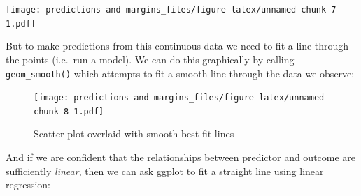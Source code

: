\documentclass[]{article}
\newenvironment{Shaded}{\begin{snugshade}}{\end{snugshade}}
\newcommand{\DataTypeTok}[1]{\textcolor[rgb]{0.13,0.29,0.53}{#1}}
\newcommand{\DecValTok}[1]{\textcolor[rgb]{0.00,0.00,0.81}{#1}}
\newcommand{\KeywordTok}[1]{\textcolor[rgb]{0.13,0.29,0.53}{\textbf{#1}}}
\newcommand{\NormalTok}[1]{#1}
\newcommand{\OperatorTok}[1]{\textcolor[rgb]{0.81,0.36,0.00}{\textbf{#1}}}
\newcommand{\StringTok}[1]{\textcolor[rgb]{0.31,0.60,0.02}{#1}}
\begin{document}
\begin{Shaded}
\end{Shaded}

\texttt{[image: predictions-and-margins\_files/figure-latex/unnamed-chunk-7-1.pdf]}

But to make predictions from this continuous data we need to fit a line through
the points (i.e.~run a model). We can do this graphically by calling
\texttt{geom\_smooth()} which attempts to fit a smooth line through the data we observe:

\begin{Shaded}
\end{Shaded}

\begin{figure}
\centering
\texttt{[image: predictions-and-margins\_files/figure-latex/unnamed-chunk-8-1.pdf]}
\caption{\label{fig:unnamed-chunk-8}Scatter plot overlaid with smooth best-fit lines}
\end{figure}

And if we are confident that the relationships between predictor and outcome are
sufficiently \emph{linear}, then we can ask ggplot to fit a straight line using
linear regression:
\end{document}
